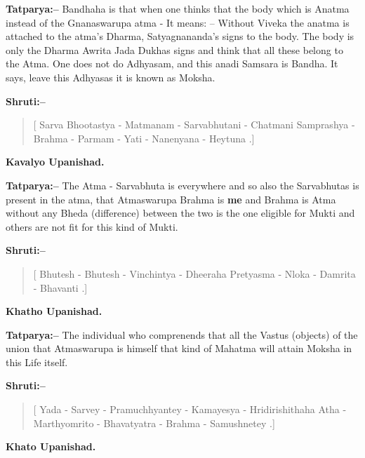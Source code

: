 \textbf{Tatparya:–} Bandhaha is that when one thinks that the body which is Anatma instead of the Gnanaswarupa atma - It means: – Without Viveka the anatma is attached to the atma's Dharma, Satyagnananda's signs to the body. The body is only the Dharma Awrita Jada Dukhas signs and think that all these belong to the Atma. One does not do Adhyasam, and this anadi Samsara is Bandha. It says, leave this Adhyasas it is known as Moksha.

\newpage

\textbf{Shruti:–}

\begin{verse}
[ Sarva Bhootastya - Matmanam - Sarvabhutani - Chatmani  Samprashya - Brahma - Parmam - Yati - Nanenyana - Heytuna .]
\end{verse}

\begin{flushright}
\textbf{Kavalyo Upanishad.}
\end{flushright}

\textbf{Tatparya:–} The Atma - Sarvabhuta is everywhere and so also the Sarvabhutas is present in the atma, that Atmaswarupa Brahma is \textbf{me} and Brahma is Atma without any Bheda (difference) between the two is the one eligible for Mukti and others are not fit for this kind of Mukti.

\textbf{Shruti:–}

\begin{verse}
[ Bhutesh - Bhutesh - Vinchintya - Dheeraha  Pretyasma - Nloka - Damrita - Bhavanti .]
\end{verse}

\begin{flushright}
\textbf{Khatho Upanishad.}
\end{flushright}

\textbf{Tatparya:–} The individual who comprenends that all the Vastus (objects) of the union that Atmaswarupa is himself that kind of Mahatma will attain Moksha in this Life itself.

\textbf{Shruti:–}

\begin{verse}
[ Yada - Sarvey - Pramuchhyantey - Kamayesya - Hridirishithaha  Atha - Marthyomrito - Bhavatyatra - Brahma - Samushnetey .]
\end{verse}

\begin{flushright}
\textbf{Khato Upanishad.}
\end{flushright}

